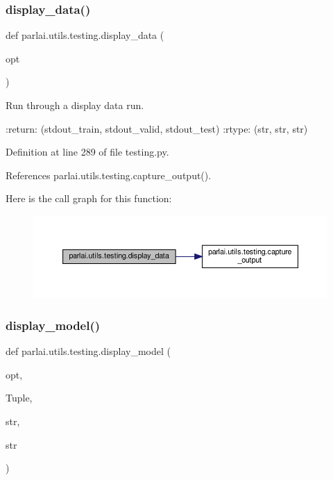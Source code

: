 \subsubsection{\texorpdfstring{display\+\_\+data()}{display\_data()}}
{\footnotesize\ttfamily def parlai.\+utils.\+testing.\+display\+\_\+data (\begin{DoxyParamCaption}\item[{}]{opt }\end{DoxyParamCaption})}

\begin{DoxyVerb}Run through a display data run.

:return: (stdout_train, stdout_valid, stdout_test)
:rtype: (str, str, str)
\end{DoxyVerb}
 

Definition at line 289 of file testing.\+py.



References parlai.\+utils.\+testing.\+capture\+\_\+output().

Here is the call graph for this function\+:
\nopagebreak
\begin{figure}[H]
\begin{center}
\leavevmode
\includegraphics[width=350pt]{namespaceparlai_1_1utils_1_1testing_a30c532f112f9beddd873382e649b3ecd_cgraph}
\end{center}
\end{figure}
\mbox{\label{namespaceparlai_1_1utils_1_1testing_a1b41200277931b2e4e684dc9452889a9}} 
\subsubsection{\texorpdfstring{display\+\_\+model()}{display\_model()}}
{\footnotesize\ttfamily def parlai.\+utils.\+testing.\+display\+\_\+model (\begin{DoxyParamCaption}\item[{}]{opt,  }\item[{}]{Tuple,  }\item[{}]{str,  }\item[{}]{str }\end{DoxyParamCaption})}

